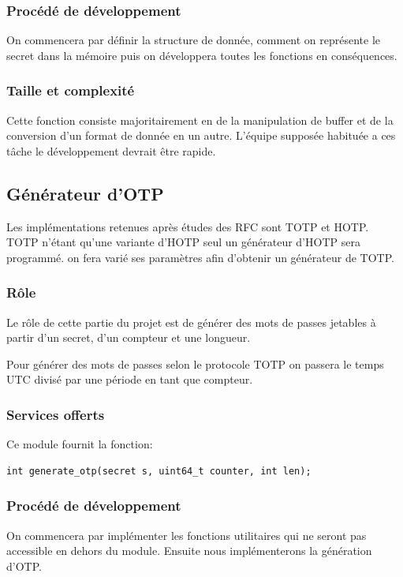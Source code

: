 \documentclass{"../../res/univ-projet"}
\begin{document}
\subsubsection{Procédé de développement}
On commencera par définir la structure de donnée, comment on représente le secret dans la mémoire
puis on développera toutes les fonctions en conséquences.

\subsubsection{Taille et complexité}
Cette fonction consiste majoritairement en de la manipulation de buffer et de la conversion d'un
format de donnée en un autre. L'équipe supposée habituée a ces tâche le développement devrait être 
rapide.

\subsection{Générateur d'OTP}
Les implémentations retenues après études des RFC sont TOTP et HOTP. TOTP
n'étant qu'une variante d'HOTP seul un générateur d'HOTP sera programmé.
on fera varié ses paramètres afin d'obtenir un générateur de TOTP.

\subsubsection{Rôle}
Le rôle de cette partie du projet est de générer des mots de passes jetables
à partir d'un secret, d'un compteur et une longueur. 

Pour générer des mots de passes selon le protocole TOTP on passera le temps UTC
divisé par une période en tant que compteur.

\subsubsection{Services offerts}
Ce module fournit la fonction:
\begin{lstlisting}
int generate_otp(secret s, uint64_t counter, int len);
\end{lstlisting}


\subsubsection{Procédé de développement}
On commencera par implémenter les fonctions utilitaires qui ne seront pas accessible en
dehors du module. Ensuite nous implémenterons la génération d'OTP.
\end{document}
